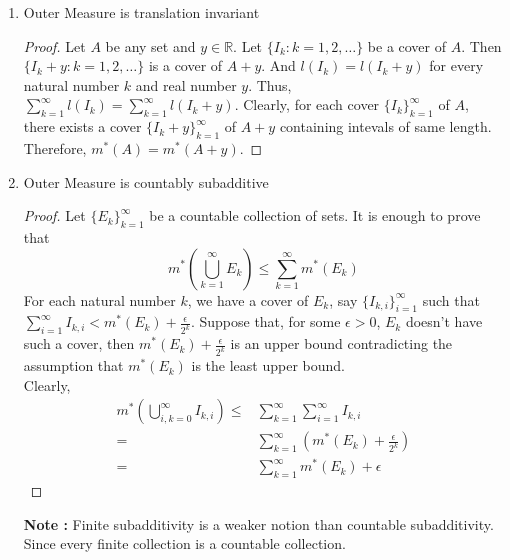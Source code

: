 \begin{enumerate}
\begin{proof}
	By monotonicity of outer measure, we have $m^\ast(J_1) \le m^\ast(I) \le m^\ast(J_2)$. However $m^\ast(J_1) = l(I)-\epsilon$ and $m^\ast(J_2) = l(I)+\epsilon$. Thus, $l(I)-\epsilon \le m^\ast(I) \le l(I)+\epsilon$.Therefore, $m^\ast(I) = l(I)$.

	\textbf{Case 3 : Unbounded Interval}
	Let $I$ be an unbounded interval. Then for any natural number $n$, there exists a closed bounded interval $J$ such that $J \subset I$ and $l(J) = n$. And $n = m^\ast(J) \le m^\ast(I),\ \forall n \in \mathbb{N}$. Therefore, $m^\ast(I) = \infty = l(I)$. 
	\end{proof}
	\item Outer Measure is translation invariant
	\begin{proof}
		Let $A$ be any set and $y \in \mathbb{R}$. Let $\{ I_k : k = 1,2,\dots \}$ be a cover of $A$. Then $\{ I_k+y : k = 1,2,\dots \}$ is a cover of $A+y$. And $l(I_k) = l(I_k+y)$ for every natural number $k$ and real number $y$. Thus, $\sum_{k=1}^\infty l(I_k) = \sum_{k=1}^\infty l(I_k+y)$. Clearly, for each cover $\{I_k\}_{k=1}^\infty$ of $A$, there exists a cover $\{ I_k+y \}_{k=1}^\infty$ of $A+y$ containing intevals of same length. Therefore, $m^\ast(A) = m^\ast(A+y)$.
	\end{proof}
	\item Outer Measure is countably subadditive
	\begin{proof}
		Let $\{E_k\}_{k=1}^\infty$ be a countable collection of sets. It is enough to prove that
		\begin{equation}
			m^\ast \left( \bigcup_{k=1}^\infty E_k \right) \le \sum_{k=1}^\infty m^\ast(E_k)
		\end{equation}
		For each natural number $k$, we have a cover of $E_k$, say $\{ I_{k,i} \}_{i = 1}^\infty$ such that $\sum_{i=1}^\infty I_{k,i} < m^\ast(E_k) + \frac{\epsilon}{2^k}$. Suppose that, for some $\epsilon > 0$, $E_k$ doesn't have such a cover, then $m^\ast(E_k) + \frac{\epsilon}{2^k}$ is an upper bound contradicting the assumption that $m^\ast(E_k)$ is the least upper bound.\\

	Clearly,
	\begin{align*}
		m^\ast \left( \bigcup_{i,k = 0}^\infty I_{k,i} \right) \le & \sum_{k=1}^\infty \sum_{i=1}^\infty I_{k,i} \\
		= & \sum_{k=1}^\infty \left( m^\ast(E_k) + \frac{\epsilon}{2^k} \right) \\
		= & \sum_{k=1}^\infty  m^\ast(E_k) + \epsilon
	\end{align*}
	\end{proof}
	\textbf{Note : } Finite subadditivity is a weaker notion than countable subadditivity. Since every finite collection is a countable collection.
\end{enumerate}

